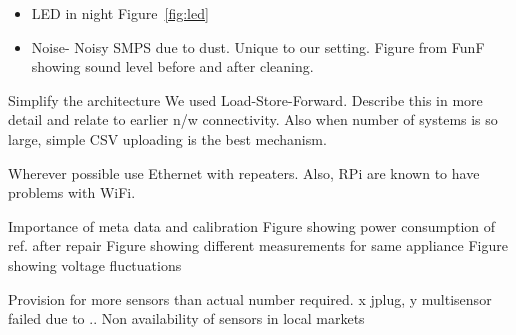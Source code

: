 \documentclass[10pt]{sensys-proc}
\newcommand{\figref}[1]{Figure~\ref{#1}}
\begin{document}
\begin{itemize}
\item LED in night \figref{fig:led}
\item Noise- Noisy SMPS due to dust. Unique to our setting. Figure from FunF showing sound level before and after cleaning.
\end{itemize}

Simplify the architecture
We used Load-Store-Forward. Describe this in more detail and relate to earlier n/w connectivity.
Also when number of systems is so large, simple CSV uploading is the best mechanism.

Wherever possible use Ethernet with repeaters. Also, RPi are known to have problems with WiFi.

Importance of meta data and calibration
Figure showing power consumption of ref. after repair
Figure showing different measurements for same appliance
Figure showing voltage fluctuations

Provision for more sensors than actual number required. x jplug, y multisensor failed due to ..
Non availability of sensors in local markets
\end{document}
